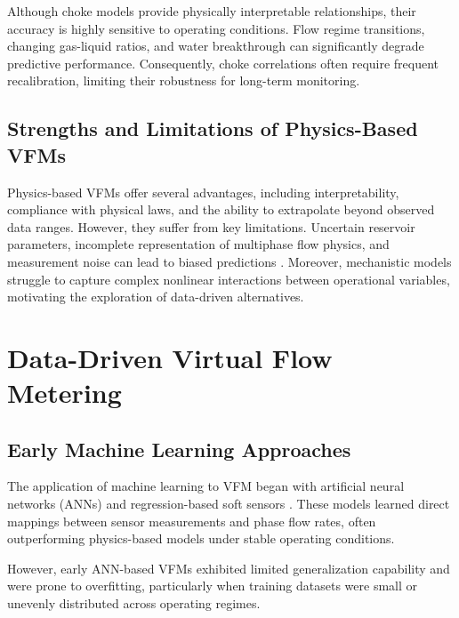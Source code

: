 \documentclass[12pt,APA]{uomthesis}
\begin{document}
Although choke models provide physically interpretable relationships, their accuracy is highly sensitive to operating conditions. Flow regime transitions, changing gas-liquid ratios, and water breakthrough can significantly degrade predictive performance. Consequently, choke correlations often require frequent recalibration, limiting their robustness for long-term monitoring.

\subsection{Strengths and Limitations of Physics-Based VFMs}
Physics-based VFMs offer several advantages, including interpretability, compliance with physical laws, and the ability to extrapolate beyond observed data ranges. However, they suffer from key limitations. Uncertain reservoir parameters, incomplete representation of multiphase flow physics, and measurement noise can lead to biased predictions \citep{bikmukhametov2020first}. Moreover, mechanistic models struggle to capture complex nonlinear interactions between operational variables, motivating the exploration of data-driven alternatives.

\section{Data-Driven Virtual Flow Metering}
\subsection{Early Machine Learning Approaches}
The application of machine learning to VFM began with artificial neural networks (ANNs) and regression-based soft sensors \citep{al2017development,al2017radial}. These models learned direct mappings between sensor measurements and phase flow rates, often outperforming physics-based models under stable operating conditions.

However, early ANN-based VFMs exhibited limited generalization capability and were prone to overfitting, particularly when training datasets were small or unevenly distributed across operating regimes.
\end{document}
